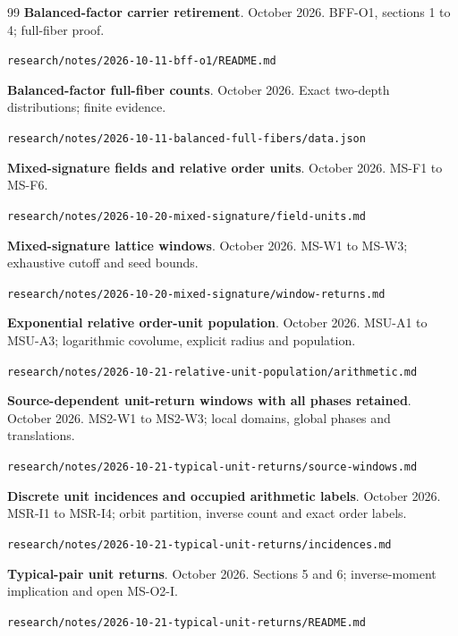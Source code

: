 \documentclass[12pt,a4paper]{article}
\begin{document}
\begin{thebibliography}{99}
\textbf{Balanced-factor carrier retirement}. October 2026. BFF-O1, sections 1 to 4; full-fiber proof.\par{\fontsize{8.6}{10}\selectfont\nolinkurl{research/notes/2026-10-11-bff-o1/README.md}\par}

\textbf{Balanced-factor full-fiber counts}. October 2026. Exact two-depth distributions; finite evidence.\par{\fontsize{8.6}{10}\selectfont\nolinkurl{research/notes/2026-10-11-balanced-full-fibers/data.json}\par}

\textbf{Mixed-signature fields and relative order units}. October 2026. MS-F1 to MS-F6.\par{\fontsize{8.6}{10}\selectfont\nolinkurl{research/notes/2026-10-20-mixed-signature/field-units.md}\par}

\textbf{Mixed-signature lattice windows}. October 2026. MS-W1 to MS-W3; exhaustive cutoff and seed bounds.\par{\fontsize{8.6}{10}\selectfont\nolinkurl{research/notes/2026-10-20-mixed-signature/window-returns.md}\par}

\textbf{Exponential relative order-unit population}. October 2026. MSU-A1 to MSU-A3; logarithmic covolume, explicit radius and population.\par{\fontsize{8.6}{10}\selectfont\nolinkurl{research/notes/2026-10-21-relative-unit-population/arithmetic.md}\par}

\textbf{Source-dependent unit-return windows with all phases retained}. October 2026. MS2-W1 to MS2-W3; local domains, global phases and translations.\par{\fontsize{8.6}{10}\selectfont\nolinkurl{research/notes/2026-10-21-typical-unit-returns/source-windows.md}\par}

\textbf{Discrete unit incidences and occupied arithmetic labels}. October 2026. MSR-I1 to MSR-I4; orbit partition, inverse count and exact order labels.\par{\fontsize{8.6}{10}\selectfont\nolinkurl{research/notes/2026-10-21-typical-unit-returns/incidences.md}\par}

\textbf{Typical-pair unit returns}. October 2026. Sections 5 and 6; inverse-moment implication and open MS-O2-I.\par{\fontsize{8.6}{10}\selectfont\nolinkurl{research/notes/2026-10-21-typical-unit-returns/README.md}\par}

\end{thebibliography}\endgroup
\end{document}
